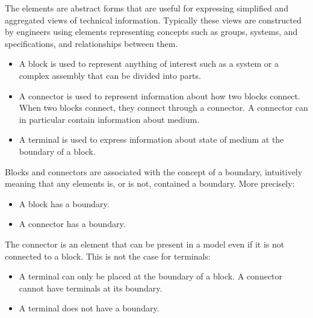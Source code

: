 \documentclass[../main.tex]{subfiles}
\begin{document}
The elements are abstract forms that are useful for expressing simplified and aggregated views of technical information. Typically these views are  constructed by engineers using elements representing  concepts such as groups, systems, and specifications, and relationships between them. 
\begin{itemize}
    \item A block is used to represent anything of interest such as a system or a complex assembly that can  be divided into parts. 
    \item A connector is used to represent information about how two blocks  connect. When two blocks connect, they connect through a connector. A connector can in particular contain information about medium. 
    \item A terminal is  used  to express information about state of medium at the boundary of a block. 
\end{itemize}


Blocks and connectors are associated with the concept of a boundary, intuitively meaning that any elements is, or is not, contained a  boundary. More precisely:
\begin{itemize}
    \item A block has a boundary.  
    \item A connector has a boundary.  
\end{itemize}
The connector is an element that can be present in a model even if it is not  connected to a block. This is not the case for terminals:
\begin{itemize}
    \item A  terminal can only be placed  at the boundary of a block. A connector cannot have terminals at its boundary.
    \item A terminal does not have a boundary.
\end{itemize}
\end{document}
